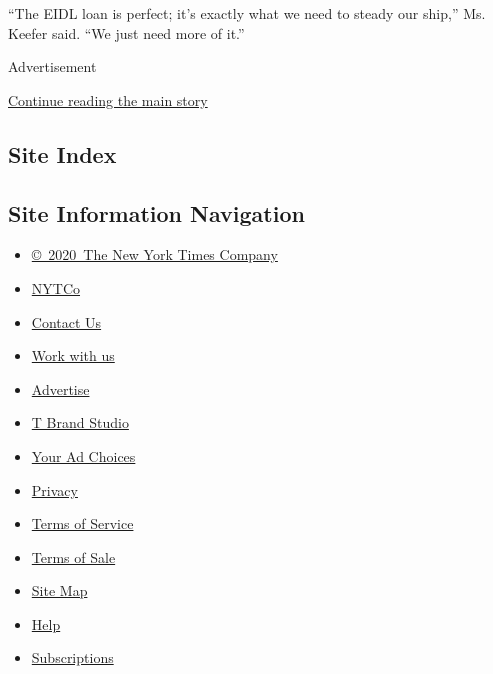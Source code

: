 ``The EIDL loan is perfect; it's exactly what we need to steady our
ship,'' Ms. Keefer said. ``We just need more of it.''

Advertisement

\protect\hyperlink{after-bottom}{Continue reading the main story}

\hypertarget{site-index}{%
\subsection{Site Index}\label{site-index}}

\hypertarget{site-information-navigation}{%
\subsection{Site Information
Navigation}\label{site-information-navigation}}

\begin{itemize}
\tightlist
\item
  \href{https://help.nytimes3xbfgragh.onion/hc/en-us/articles/115014792127-Copyright-notice}{©~2020~The
  New York Times Company}
\end{itemize}

\begin{itemize}
\tightlist
\item
  \href{https://www.nytco.com/}{NYTCo}
\item
  \href{https://help.nytimes3xbfgragh.onion/hc/en-us/articles/115015385887-Contact-Us}{Contact
  Us}
\item
  \href{https://www.nytco.com/careers/}{Work with us}
\item
  \href{https://nytmediakit.com/}{Advertise}
\item
  \href{http://www.tbrandstudio.com/}{T Brand Studio}
\item
  \href{https://www.nytimes3xbfgragh.onion/privacy/cookie-policy\#how-do-i-manage-trackers}{Your
  Ad Choices}
\item
  \href{https://www.nytimes3xbfgragh.onion/privacy}{Privacy}
\item
  \href{https://help.nytimes3xbfgragh.onion/hc/en-us/articles/115014893428-Terms-of-service}{Terms
  of Service}
\item
  \href{https://help.nytimes3xbfgragh.onion/hc/en-us/articles/115014893968-Terms-of-sale}{Terms
  of Sale}
\item
  \href{https://spiderbites.nytimes3xbfgragh.onion}{Site Map}
\item
  \href{https://help.nytimes3xbfgragh.onion/hc/en-us}{Help}
\item
  \href{https://www.nytimes3xbfgragh.onion/subscription?campaignId=37WXW}{Subscriptions}
\end{itemize}
